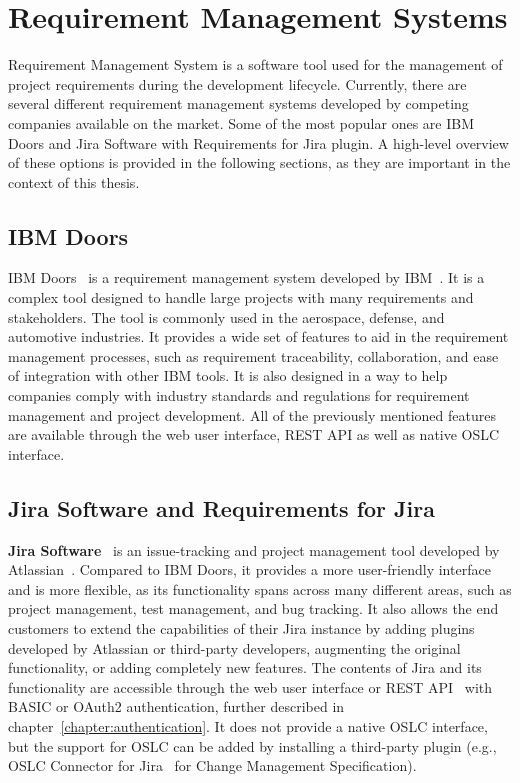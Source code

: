 \section{Requirement Management Systems}
Requirement Management System is a software tool used for the management of project requirements during the development lifecycle. Currently, there are several different requirement management systems developed by competing companies available on the market. Some of the most popular ones are IBM Doors and Jira Software with Requirements for Jira plugin. A high-level overview of these options is provided in the following sections, as they are important in the context of this thesis.

\subsection*{IBM Doors}
IBM Doors \cite{ibm_doors} is a requirement management system developed by IBM \cite{ibm}. It is a complex tool designed to handle large projects with many requirements and stakeholders. The tool is commonly used in the aerospace, defense, and automotive industries. It provides a wide set of features to aid in the requirement management processes, such as requirement traceability, collaboration, and ease of integration with other IBM tools. It is also designed in a way to help companies comply with industry standards and regulations for requirement management and project development. All of the previously mentioned features are available through the web user interface, REST API as well as native OSLC interface.

\subsection*{Jira Software and Requirements for Jira}
\textbf{Jira Software} \cite{jira} is an issue-tracking and project management tool developed by Atlassian \cite{atlassian}. Compared to IBM Doors, it provides a more user-friendly interface and is more flexible, as its functionality spans across many different areas, such as project management, test management, and bug tracking. It also allows the end customers to extend the capabilities of their Jira instance by adding plugins developed by Atlassian or third-party developers, augmenting the original functionality, or adding completely new features. The contents of Jira and its functionality are accessible through the web user interface or REST API \cite{jira_api} with BASIC or OAuth2 authentication, further described in chapter \ref{chapter:authentication}. It does not provide a native OSLC interface, but the support for OSLC can be added by installing a third-party plugin (e.g., OSLC Connector for Jira \cite{oslc_connector_for_jira} for Change Management Specification).

